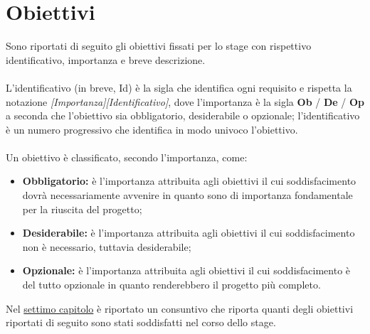 \section{Obiettivi}
Sono riportati di seguito gli obiettivi fissati per lo stage con rispettivo identificativo, importanza e breve descrizione. \\
\\
L'identificativo (in breve, Id) è la sigla che identifica ogni requisito e rispetta la notazione \textit{[Importanza][Identificativo]}, dove l'importanza è la sigla \textbf{Ob} / \textbf{De} / \textbf{Op} a seconda che l'obiettivo sia obbligatorio, desiderabile o opzionale; l'identificativo è un numero progressivo che identifica in modo univoco l'obiettivo. \\
\\
Un obiettivo è classificato, secondo l'importanza, come:
    \begin{itemize}
        \item \textbf{Obbligatorio:} è l'importanza attribuita agli obiettivi il cui soddisfacimento dovrà necessariamente avvenire in quanto sono di importanza fondamentale per la riuscita del progetto;
        \item \textbf{Desiderabile:} è l'importanza attribuita agli obiettivi il cui soddisfacimento non è necessario, tuttavia desiderabile;
        \item \textbf{Opzionale:} è l'importanza attribuita agli obiettivi il cui soddisfacimento è del tutto opzionale in quanto renderebbero il progetto più completo.
    \end{itemize}%

\noindent
Nel {\hyperref[cap:conclusioni]{settimo capitolo}}
è riportato un consuntivo che riporta quanti degli obiettivi riportati di seguito sono stati soddisfatti nel corso dello stage.

